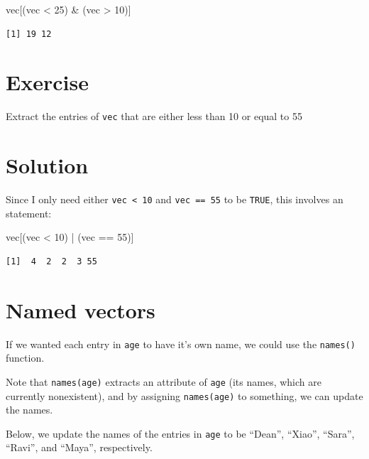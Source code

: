 \documentclass[
  letterpaper,
  DIV=11,
  numbers=noendperiod]{scrreprt}
\newenvironment{Shaded}{\begin{snugshade}}{\end{snugshade}}
\newcommand{\DecValTok}[1]{\textcolor[rgb]{0.68,0.00,0.00}{#1}}
\newcommand{\NormalTok}[1]{\textcolor[rgb]{0.00,0.23,0.31}{#1}}
\newcommand{\SpecialCharTok}[1]{\textcolor[rgb]{0.37,0.37,0.37}{#1}}
\begin{document}
\begin{Shaded}
\begin{Highlighting}[]
\NormalTok{vec[(vec }\SpecialCharTok{\textless{}} \DecValTok{25}\NormalTok{) }\SpecialCharTok{\&}\NormalTok{ (vec }\SpecialCharTok{\textgreater{}} \DecValTok{10}\NormalTok{)]}
\end{Highlighting}
\end{Shaded}

\begin{verbatim}
[1] 19 12
\end{verbatim}

\section{Exercise}

Extract the entries of \texttt{vec} that are either less than 10 or
equal to 55

\section{Solution}

Since I only need either \texttt{vec\ \textless{}\ 10} and
\texttt{vec\ ==\ 55} to be \texttt{TRUE}, this involves an
\texttt{\textbar{}} statement:

\begin{Shaded}
\begin{Highlighting}[]
\NormalTok{vec[(vec }\SpecialCharTok{\textless{}} \DecValTok{10}\NormalTok{) }\SpecialCharTok{|}\NormalTok{ (vec }\SpecialCharTok{==} \DecValTok{55}\NormalTok{)]}
\end{Highlighting}
\end{Shaded}

\begin{verbatim}
[1]  4  2  2  3 55
\end{verbatim}

\section{Named vectors}\label{named-vectors}

If we wanted each entry in \texttt{age} to have it's own name, we could
use the \texttt{names()} function.

Note that \texttt{names(age)} extracts an attribute of \texttt{age} (its
names, which are currently nonexistent), and by assigning
\texttt{names(age)} to something, we can update the names.

Below, we update the names of the entries in \texttt{age} to be
``Dean'', ``Xiao'', ``Sara'', ``Ravi'', and ``Maya'', respectively.
\end{document}
